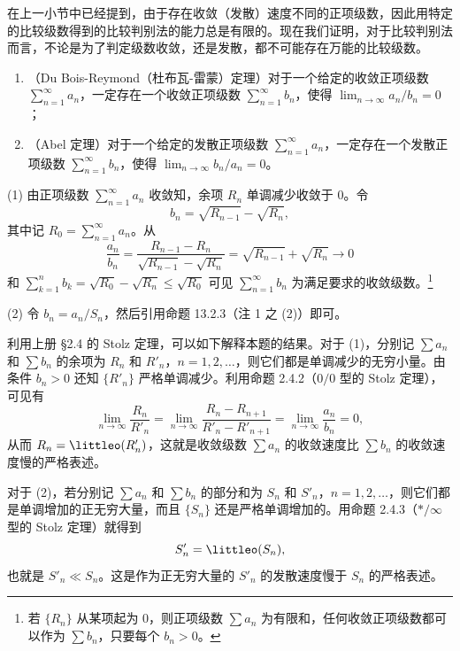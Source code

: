 在上一小节中已经提到，由于存在收敛（发散）速度不同的正项级数，因此用特定的比较级数得到的比较判别法的能力总是有限的。现在我们证明，对于比较判别法而言，不论是为了判定级数收敛，还是发散，都不可能存在万能的比较级数。

\begin{xproposition}[13.2.5]
\begin{enumerate}[label=(\arabic*)]
\item （Du Bois-Reymond（杜布瓦-雷蒙）定理）对于一个给定的收敛正项级数 $\sum_{n=1}^{\infty}a_n$，一定存在一个收敛正项级数 $\sum_{n=1}^{\infty}b_n$，使得 $\lim_{n\to\infty}a_n/b_n=0$；
\item （Abel 定理）对于一个给定的发散正项级数 $\sum_{n=1}^{\infty}a_n$，一定存在一个发散正项级数 $\sum_{n=1}^{\infty}b_n$，使得 $\lim_{n\to\infty}b_n/a_n=0$。
\end{enumerate}
\end{xproposition}
\begin{xproof}
(1) 由正项级数 $\sum_{n=1}^{\infty}a_n$ 收敛知，余项 $R_n$ 单调减少收敛于 0。令
\[
b_n=\sqrt{R_{n-1}}-\sqrt{R_n},
\]
其中记 $R_0=\sum_{n=1}^{\infty}a_n$。从
\[
\frac{a_n}{b_n}=\frac{R_{n-1}-R_n}{\sqrt{R_{n-1}}-\sqrt{R_n}}=\sqrt{R_{n-1}}+\sqrt{R_n}\to0
\]
和 $\sum_{k=1}^{n}b_k=\sqrt{R_0}-\sqrt{R_n}\leq\sqrt{R_0}$ 可见 $\sum_{n=1}^{\infty}b_n$ 为满足要求的收敛级数。\footnote{若 $\{R_n\}$ 从某项起为 0，则正项级数 $\sum a_n$ 为有限和，任何收敛正项级数都可以作为 $\sum b_n$，只要每个 $b_n>0$。}

(2) 令 $b_n=a_n/S_n$，然后引用命题 13.2.3（注 1 之 (2)）即可。
\end{xproof}

\begin{xremark}
利用上册 §2.4 的 Stolz 定理，可以如下解释本题的结果。对于 (1)，分别记 $\sum a_n$ 和 $\sum b_n$ 的余项为 $R_n$ 和 $R'_n$，$n=1,2,\ldots$，则它们都是单调减少的无穷小量。由条件 $b_n>0$ 还知 $\{R'_n\}$ 严格单调减少。利用命题 2.4.2（$0/0$ 型的 Stolz 定理），可见有
\[
\lim_{n\to\infty}\frac{R_n}{R'_n}=\lim_{n\to\infty}\frac{R_n-R_{n+1}}{R'_n-R'_{n+1}}=\lim_{n\to\infty}\frac{a_n}{b_n}=0,
\]
从而 $R_n=\littleo(R'_n)$，这就是收敛级数 $\sum a_n$ 的收敛速度比 $\sum b_n$ 的收敛速度慢的严格表述。

对于 (2)，若分别记 $\sum a_n$ 和 $\sum b_n$ 的部分和为 $S_n$ 和 $S'_n$，$n=1,2,\ldots$，则它们都是单调增加的正无穷大量，而且 $\{S_n\}$ 还是严格单调增加的。用命题 2.4.3（$*/\infty$ 型的 Stolz 定理）就得到
\[
S'_n=\littleo(S_n),
\]
也就是 $S'_n\ll S_n$。这是作为正无穷大量的 $S'_n$ 的发散速度慢于 $S_n$ 的严格表述。
\end{xremark}


